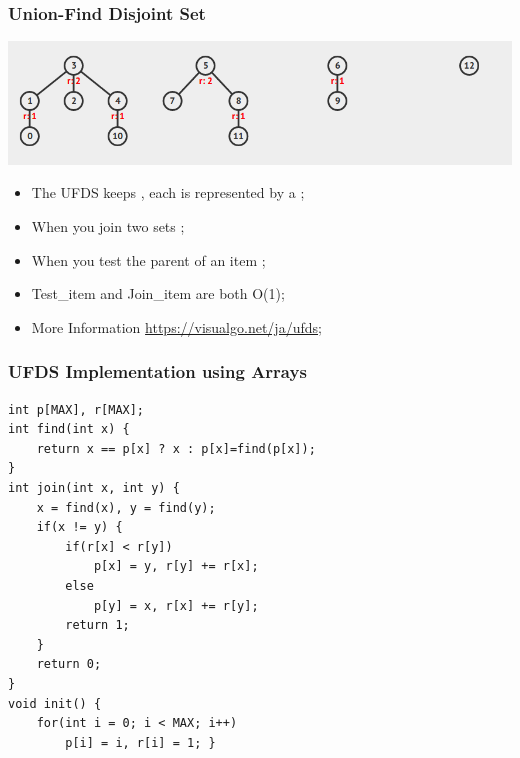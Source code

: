 \documentclass{beamer}
\begin{document}
\begin{frame}
  \frametitle{Union-Find Disjoint Set}

  \begin{center}
    \includegraphics[width=.9\textwidth]{img/ufds1}
  \end{center}

  \begin{itemize}
  \item The UFDS keeps , each is represented by a ;
  \item When you join two sets ;
  \item When you test the parent of an item ;
  \item Test\_item and Join\_item are both O(1);
  \item More Information \url{https://visualgo.net/ja/ufds};
  \end{itemize}
\end{frame}

\begin{frame}[fragile]
  \frametitle{UFDS Implementation using Arrays}

  {\small
\begin{verbatim}
int p[MAX], r[MAX];
int find(int x) {
    return x == p[x] ? x : p[x]=find(p[x]);
}
int join(int x, int y) {
    x = find(x), y = find(y);
    if(x != y) {
        if(r[x] < r[y])
            p[x] = y, r[y] += r[x];
        else
            p[y] = x, r[x] += r[y];
        return 1;
    }
    return 0;
}
void init() {
    for(int i = 0; i < MAX; i++)
        p[i] = i, r[i] = 1; }

\end{verbatim}
}

\end{frame}
\end{document}
